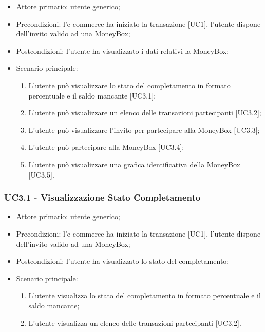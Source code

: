 \begin{itemize}
    \item Attore primario: utente generico;
    \item Precondizioni: l'e-commerce\glo{} ha iniziato la transazione [UC1], l'utente dispone dell'invito valido ad una MoneyBox\glo{};
    \item Postcondizioni: l'utente ha visualizzato i dati relativi la MoneyBox;
    \item Scenario principale:
          \begin{enumerate}
                \item L'utente può visualizzare lo stato del completamento in formato percentuale e il saldo mancante [UC3.1];
                \item L'utente può visualizzare un elenco delle transazioni partecipanti [UC3.2];
                \item L'utente può visualizzare l'invito per partecipare alla MoneyBox [UC3.3];
                \item L'utente può partecipare alla MoneyBox [UC3.4];
                \item L'utente può visualizzare una grafica identificativa della MoneyBox [UC3.5].
    \end{enumerate}
\end{itemize}

\subsubsection{UC3.1 - Visualizzazione Stato Completamento}

\begin{itemize}
    \item Attore primario: utente generico;
    \item Precondizioni: l'e-commerce\glo{} ha iniziato la transazione [UC1], l'utente dispone dell'invito valido ad una MoneyBox\glo{};
    \item Postcondizioni: l'utente ha visualizzato lo stato del completamento;
    \item Scenario principale:
          \begin{enumerate}
              \item L'utente visualizza lo stato del completamento in formato percentuale e il saldo mancante;
              \item L'utente visualizza un elenco delle transazioni partecipanti [UC3.2].
          \end{enumerate}
\end{itemize}

